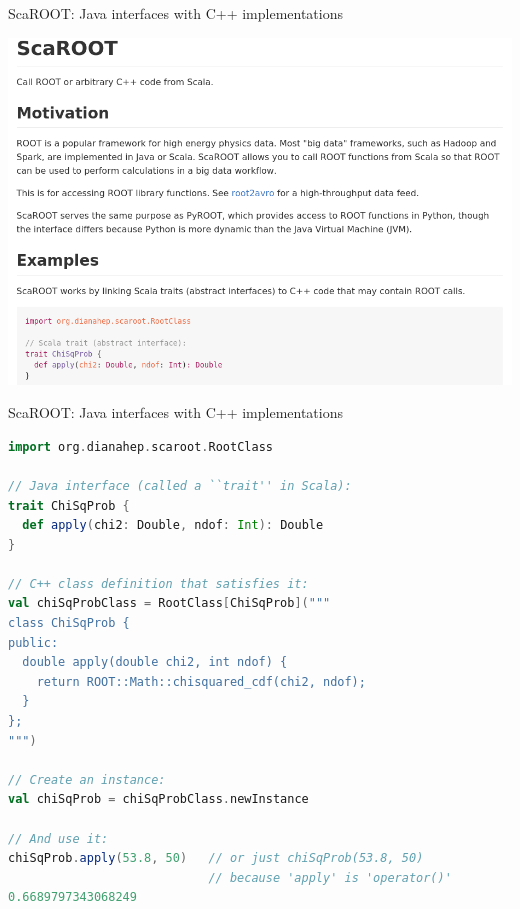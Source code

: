 \documentclass{beamer}
\begin{document}
\begin{frame}{ScaROOT: Java interfaces with C++ implementations}

\vfill
{}

\vfill
\includegraphics[width=\linewidth]{wiki.png}
\end{frame}

\begin{frame}[fragile]{ScaROOT: Java interfaces with C++ implementations}
\begin{lstlisting}[language=scala]
import org.dianahep.scaroot.RootClass

// Java interface (called a ``trait'' in Scala):
trait ChiSqProb {
  def apply(chi2: Double, ndof: Int): Double
}

// C++ class definition that satisfies it:
val chiSqProbClass = RootClass[ChiSqProb]("""
class ChiSqProb {
public:
  double apply(double chi2, int ndof) {
    return ROOT::Math::chisquared_cdf(chi2, ndof);
  }
};
""")

// Create an instance:
val chiSqProb = chiSqProbClass.newInstance

// And use it:
chiSqProb.apply(53.8, 50)   // or just chiSqProb(53.8, 50)
                            // because 'apply' is 'operator()'
0.6689797343068249
\end{lstlisting}
\end{frame}
\end{document}
